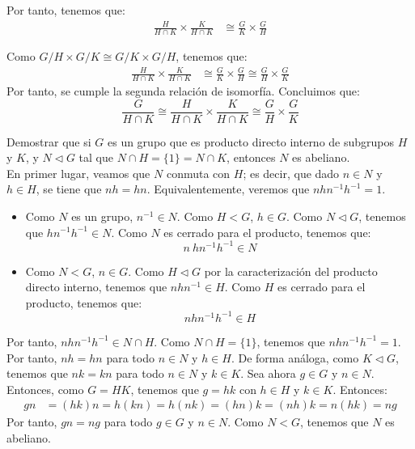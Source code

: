 \begin{ejercicio}
    Por tanto, tenemos que:
    \begin{align*}
        \frac{H}{H\cap K}\times \frac{K}{H\cap K} &\cong \frac{G}{K}\times \frac{G}{H}
    \end{align*}

    Como $G/H\times G/K\cong G/K\times G/H$, tenemos que:
    \begin{align*}
        \frac{H}{H\cap K}\times \frac{K}{H\cap K} &\cong \frac{G}{K}\times \frac{G}{H} \cong \frac{G}{H}\times \frac{G}{K}
    \end{align*}
    Por tanto, se cumple la segunda relación de isomorfía. Concluimos que:
    \begin{equation*}
        \frac{G}{H\cap K}\cong \frac{H}{H\cap K}\times \frac{K}{H\cap K}\cong \frac{G}{H}\times \frac{G}{K}
    \end{equation*}
\end{ejercicio}

\begin{ejercicio}
    Demostrar que si $G$ es un grupo que es producto directo interno de subgrupos $H$ y $K$, y $N\lhd G$ tal que $N\cap H=\{1\}=N\cap K$, entonces $N$ es abeliano.\\

    En primer lugar, veamos que $N$ conmuta con $H$; es decir, que dado $n\in N$ y $h\in H$, se tiene que $nh=hn$. Equivalentemente, veremos que $nhn^{-1}h^{-1}=1$.
    \begin{itemize}
        \item Como $N$ es un grupo, $n^{-1}\in N$. Como $H<G$, $h\in G$. Como $N\lhd G$, tenemos que $hn^{-1}h^{-1}\in N$. Como $N$ es cerrado para el producto, tenemos que:
        \begin{equation*}
            n\ hn^{-1}h^{-1} \in N
        \end{equation*}

        \item Como $N<G$, $n\in G$. Como $H\lhd G$ por la caracterización del producto directo interno, tenemos que $nhn^{-1}\in H$. Como $H$ es cerrado para el producto, tenemos que:
        \begin{equation*}
            nhn^{-1}h^{-1} \in H
        \end{equation*}
    \end{itemize}

    Por tanto, $nhn^{-1}h^{-1}\in N\cap H$. Como $N\cap H=\{1\}$, tenemos que $nhn^{-1}h^{-1}=1$. Por tanto, $nh=hn$ para todo $n\in N$ y $h\in H$. De forma análoga, como $K\lhd G$, tenemos que $nk=kn$ para todo $n\in N$ y $k\in K$. Sea ahora $g\in G$ y $n\in N$. Entonces, como $G=HK$, tenemos que $g=hk$ con $h\in H$ y $k\in K$. Entonces:
    \begin{align*}
        gn &= (hk)n = h(kn) = h(nk) = (hn)k = (nh)k = n(hk) = ng
    \end{align*}
    Por tanto, $gn=ng$ para todo $g\in G$ y $n\in N$. Como $N<G$, tenemos que $N$ es abeliano.
\end{ejercicio}

